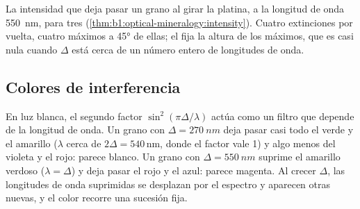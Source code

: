 \begin{omfigure}

{\small La intensidad que deja pasar un grano al girar la platina, a la longitud de onda \qty{550}{nm}, para tres
 (\cref{thm:b1:optical-mineralogy:intensity}). Cuatro extinciones por vuelta, cuatro máximos a \ang{45} de
ellas; el  fija la altura de los máximos, que es casi nula cuando $\Delta$ está cerca de un número entero de
longitudes de onda.}
\end{omfigure}

\subsection{Colores de interferencia}

En luz blanca, el segundo factor $\sin^2(\pi\Delta/\lambda)$ actúa como un filtro que depende de la longitud de onda.
Un grano con $\Delta = \qty{270}{nm}$ deja pasar casi todo el verde y el amarillo ($\lambda$ cerca de
$2\Delta = 540$\,nm, donde el factor vale 1) y algo menos del violeta y el rojo: parece blanco. Un grano con
$\Delta = \qty{550}{nm}$ suprime el amarillo verdoso ($\lambda = \Delta$) y deja pasar el rojo y el azul: parece
magenta. Al crecer $\Delta$, las longitudes de onda suprimidas se desplazan por el espectro y aparecen otras nuevas,
y el color recorre una sucesión fija.

